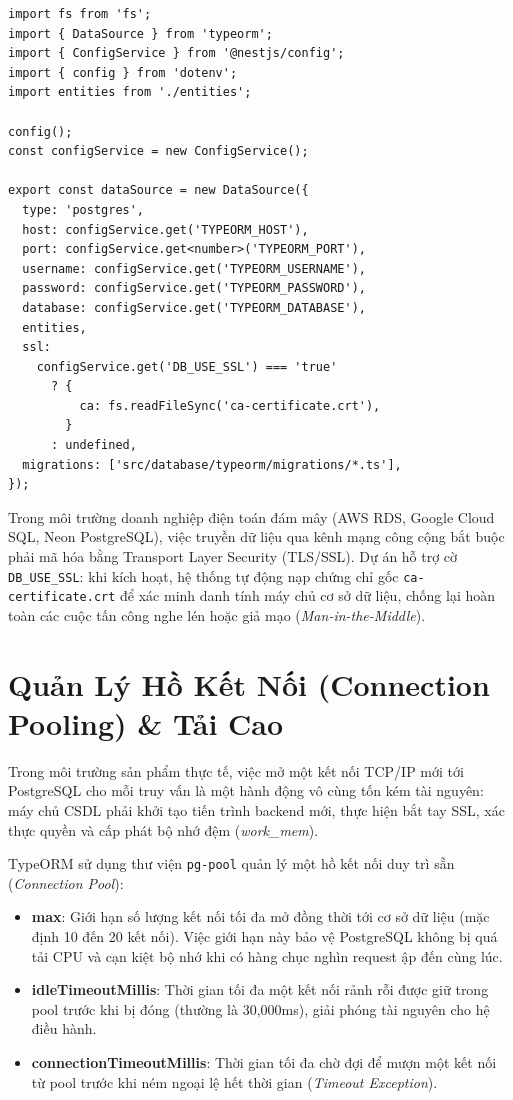 \documentclass[12pt,a4paper,oneside]{book}
\begin{document}
\begin{codebox}
\begin{Verbatim}[fontsize=\small]
import fs from 'fs';
import { DataSource } from 'typeorm';
import { ConfigService } from '@nestjs/config';
import { config } from 'dotenv';
import entities from './entities';

config();
const configService = new ConfigService();

export const dataSource = new DataSource({
  type: 'postgres',
  host: configService.get('TYPEORM_HOST'),
  port: configService.get<number>('TYPEORM_PORT'),
  username: configService.get('TYPEORM_USERNAME'),
  password: configService.get('TYPEORM_PASSWORD'),
  database: configService.get('TYPEORM_DATABASE'),
  entities,
  ssl:
    configService.get('DB_USE_SSL') === 'true'
      ? {
          ca: fs.readFileSync('ca-certificate.crt'),
        }
      : undefined,
  migrations: ['src/database/typeorm/migrations/*.ts'],
});
\end{Verbatim}
\end{codebox}

\begin{infobox}
  Trong môi trường doanh nghiệp điện toán đám mây (AWS RDS, Google Cloud SQL, Neon PostgreSQL), việc truyền dữ liệu qua kênh mạng công cộng bắt buộc phải mã hóa bằng Transport Layer Security (TLS/SSL). Dự án hỗ trợ cờ \texttt{DB\_USE\_SSL}: khi kích hoạt, hệ thống tự động nạp chứng chỉ gốc \texttt{ca-certificate.crt} để xác minh danh tính máy chủ cơ sở dữ liệu, chống lại hoàn toàn các cuộc tấn công nghe lén hoặc giả mạo (\textit{Man-in-the-Middle}).
\end{infobox}

\section{Quản Lý Hồ Kết Nối (Connection Pooling) \& Tải Cao}
Trong môi trường sản phẩm thực tế, việc mở một kết nối TCP/IP mới tới PostgreSQL cho mỗi truy vấn là một hành động vô cùng tốn kém tài nguyên: máy chủ CSDL phải khởi tạo tiến trình backend mới, thực hiện bắt tay SSL, xác thực quyền và cấp phát bộ nhớ đệm (\textit{work\_mem}).

TypeORM sử dụng thư viện \texttt{pg-pool} quản lý một hồ kết nối duy trì sẵn (\textit{Connection Pool}):
\begin{itemize}
  \item \textbf{max}: Giới hạn số lượng kết nối tối đa mở đồng thời tới cơ sở dữ liệu (mặc định 10 đến 20 kết nối). Việc giới hạn này bảo vệ PostgreSQL không bị quá tải CPU và cạn kiệt bộ nhớ khi có hàng chục nghìn request ập đến cùng lúc.
  \item \textbf{idleTimeoutMillis}: Thời gian tối đa một kết nối rảnh rỗi được giữ trong pool trước khi bị đóng (thường là 30,000ms), giải phóng tài nguyên cho hệ điều hành.
  \item \textbf{connectionTimeoutMillis}: Thời gian tối đa chờ đợi để mượn một kết nối từ pool trước khi ném ngoại lệ hết thời gian (\textit{Timeout Exception}).
\end{itemize}
\end{document}
